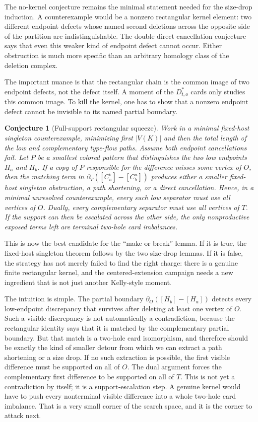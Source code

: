 \documentclass[11pt]{article}
\newtheorem{conjecture}{Conjecture}
\begin{document}
The no-kernel conjecture remains the minimal statement needed for the
size-drop induction.  A counterexample would be a nonzero rectangular kernel
element: two different endpoint defects whose named second deletions across
the opposite side of the partition are indistinguishable.  The double direct
cancellation conjecture says that even this weaker kind of endpoint defect
cannot occur.  Either obstruction is much more specific than an arbitrary
homology class of the deletion complex.

The important nuance is that the rectangular chain is the common image of two
endpoint defects, not the defect itself.  A moment of the \(D_{t,o}^\ast\)
cards only studies this common image.  To kill the kernel, one has to show
that a nonzero endpoint defect cannot be invisible to its named partial
boundary.

\begin{conjecture}[Full-support rectangular squeeze]
Work in a minimal fixed-host singleton counterexample, minimizing first
\(|V(K)|\) and then the total length of the low and complementary type-flow
paths.  Assume both endpoint cancellations fail.  Let \(P\) be a smallest
colored pattern that distinguishes the two low endpoints \(H_a\) and
\(H_b\).  If a copy of \(P\) responsible for the difference misses some
vertex of \(O\), then the matching term in
\(\partial_T([C_a^b]-[C_b^a])\) produces either a smaller fixed-host
singleton obstruction, a path shortening, or a direct cancellation.  Hence,
in a minimal unresolved counterexample, every such low separator must use all
vertices of \(O\).  Dually, every complementary separator must use all
vertices of \(T\).  If the support can then be escalated across the other
side, the only nonproductive exposed terms left are terminal two-hole card
imbalances.
\end{conjecture}

This is now the best candidate for the ``make or break'' lemma.  If it is
true, the fixed-host singleton theorem follows by the two size-drop lemmas.
If it is false, the strategy has not merely failed to find the right charge:
there is a genuine finite rectangular kernel, and the centered-extension
campaign needs a new ingredient that is not just another Kelly-style moment.

The intuition is simple.  The partial boundary \(\partial_O([H_b]-[H_a])\)
detects every low-endpoint discrepancy that survives after deleting at least
one vertex of \(O\).  Such a visible discrepancy is not automatically a
contradiction, because the rectangular identity says that it is matched by
the complementary partial boundary.  But that match is a two-hole card
isomorphism, and therefore should be exactly the kind of smaller detour from
which we can extract a path shortening or a size drop.  If no such extraction
is possible, the first visible difference must be supported on all of
\(O\).  The dual argument forces the complementary first difference to be
supported on all of \(T\).  This is not yet a contradiction by itself; it is a
support-escalation step.  A genuine kernel would have to push every
nonterminal visible difference into a whole two-hole card imbalance.  That is
a very small corner of the search space, and it is the corner to attack next.
\end{document}
